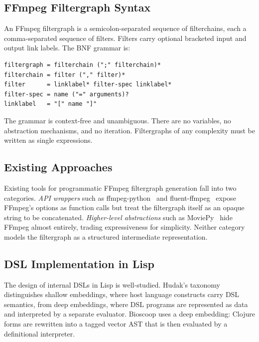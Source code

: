 \documentclass[conference]{IEEEtran}
\begin{document}
\subsection{FFmpeg Filtergraph Syntax}

An FFmpeg filtergraph is a semicolon-separated sequence of filterchains, each a comma-separated sequence of filters. Filters carry optional bracketed input and output link labels. The BNF grammar is:

\begin{lstlisting}[language=BNF, caption={FFmpeg filtergraph grammar (simplified)}]
filtergraph = filterchain (";" filterchain)*
filterchain = filter ("," filter)*
filter      = linklabel* filter-spec linklabel*
filter-spec = name ("=" arguments)?
linklabel   = "[" name "]"
\end{lstlisting}

The grammar is context-free and unambiguous. There are no variables, no abstraction mechanisms, and no iteration. Filtergraphs of any complexity must be written as single expressions.

\subsection{Existing Approaches}

Existing tools for programmatic FFmpeg filtergraph generation fall into two categories. \emph{API wrappers} such as ffmpeg-python~\cite{ffmpegpython} and fluent-ffmpeg~\cite{fluentffmpeg} expose FFmpeg's options as function calls but treat the filtergraph itself as an opaque string to be concatenated. \emph{Higher-level abstractions} such as MoviePy~\cite{moviepy} hide FFmpeg almost entirely, trading expressiveness for simplicity. Neither category models the filtergraph as a structured intermediate representation.

\subsection{DSL Implementation in Lisp}

The design of internal DSLs in Lisp is well-studied. Hudak's taxonomy~\cite{hudak} distinguishes shallow embeddings, where host language constructs carry DSL semantics, from deep embeddings, where DSL programs are represented as data and interpreted by a separate evaluator. Bioscoop uses a deep embedding: Clojure forms are rewritten into a tagged vector AST that is then evaluated by a definitional interpreter.
\end{document}
